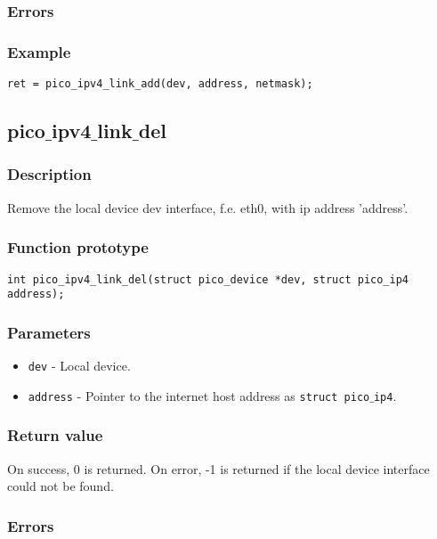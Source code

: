 \subsubsection*{Errors}

\subsubsection*{Example}
\begin{verbatim}
ret = pico_ipv4_link_add(dev, address, netmask);
\end{verbatim}



\subsection{pico$\_$ipv4$\_$link$\_$del}

\subsubsection*{Description}
Remove the local device dev interface, f.e. eth0, with ip address 'address'.

\subsubsection*{Function prototype}
\begin{verbatim}
int pico_ipv4_link_del(struct pico_device *dev, struct pico_ip4 address); 
\end{verbatim}

\subsubsection*{Parameters}
\begin{itemize}[noitemsep]
\item \texttt{dev} - Local device.
\item \texttt{address} - Pointer to the internet host address as \texttt{struct pico$\_$ip4}.
\end{itemize}

\subsubsection*{Return value}
On success, 0 is returned. On error, -1 is returned if the local device interface could not be found. 

\subsubsection*{Errors}


